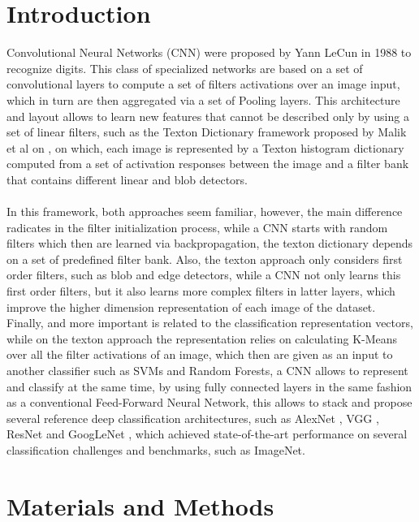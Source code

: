 \documentclass[10pt,twocolumn,letterpaper]{article}
\begin{document}
\section{Introduction}
Convolutional Neural Networks (CNN) were proposed by Yann LeCun \cite{Cun:1990:HDR:109230.109279} in 1988 to recognize digits. This class of specialized networks are based on a set of convolutional layers to compute a set of filters activations over an image input, which in turn are then aggregated via a set of Pooling layers. This architecture and layout allows to learn new features that cannot be described only by using a set of linear filters, such as the Texton Dictionary framework proposed by Malik et al on \cite{Malik2001}, on which, each image is represented by a Texton histogram dictionary computed from a set of activation responses between the image and a filter bank that contains different linear and blob detectors. 
\\
\\
In this framework, both approaches seem familiar, however, the main difference radicates in the filter initialization process, while a CNN starts with random filters which then are learned via backpropagation, the texton dictionary depends on a set of predefined filter bank. Also, the texton approach only considers first order filters, such as blob and edge detectors, while a CNN not only learns this first order filters, but it also learns more complex filters in latter layers, which improve the higher dimension representation of each image of the dataset. Finally, and more important is related to the classification representation vectors, while on the texton approach the representation relies on calculating K-Means over all the filter activations of an image, which then are given as an input to another classifier such as SVMs and Random Forests, a CNN allows to represent and classify at the same time, by using fully connected layers in the same fashion as a conventional Feed-Forward Neural Network, this allows to stack and propose several reference deep classification architectures, such as AlexNet \cite{Krizhevsky:2012:ICD:2999134.2999257}, VGG \cite{Simonyan14c}, ResNet \cite{he2016deep} and GoogLeNet \cite{szegedy2015going}, which achieved state-of-the-art performance on several classification challenges and benchmarks, such as ImageNet. 

\section{Materials and Methods}
\end{document}
